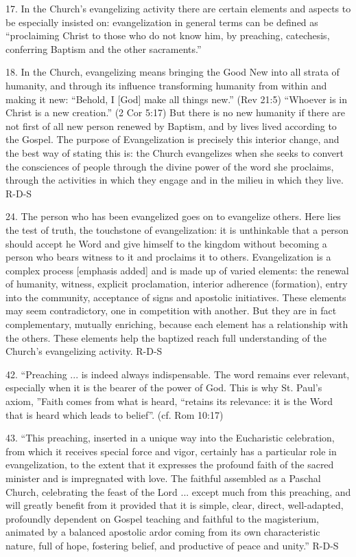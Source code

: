 \documentclass[oneside]{book}
\begin{document}
17. In the Church's evangelizing activity there are certain elements and aspects
to be especially insisted on: evangelization in general terms can be defined as
``proclaiming Christ to those who do not know him, by preaching, catechesis,
conferring Baptism and the other sacraments.''

18. In the Church, evangelizing means bringing the Good New into all strata of
humanity, and through its influence transforming humanity from within and making
it new: ``Behold, I [God] make all things new.'' (Rev 21:5) ``Whoever is in
Christ is a new creation.'' (2 Cor 5:17) But there is no new humanity if there
are not first of all new person renewed by Baptism, and by lives lived according
to the Gospel. The purpose of Evangelization is precisely this interior change,
and the best way of stating this is: the Church evangelizes when she seeks to
convert the consciences of people through the divine power of the word she
proclaims, through the activities in which they engage and in the milieu in
which they live.
R-D-S

24. The person who has been evangelized goes on to evangelize others. Here lies
the test of truth, the touchstone of evangelization: it is unthinkable that a
person should accept he Word and give himself to the kingdom without becoming a
person who bears witness to it and proclaims it to others. Evangelization is a
complex process [emphasis added] and is made up of varied elements: the renewal
of humanity, witness, explicit proclamation, interior adherence (formation),
entry into the community, acceptance of signs and apostolic initiatives. These
elements may seem contradictory, one in competition with another. But they are
in fact complementary, mutually enriching, because each element has a
relationship with the others. These elements help the baptized reach full
understanding of the Church's evangelizing activity.
R-D-S

42. ``Preaching ... is indeed always indispensable. The word remains ever
relevant, especially when it is the bearer of the power of God. This is why
St. Paul's axiom, ''Faith comes from what is heard, ``retains its relevance: it
is the Word that is heard which leads to belief''. (cf. Rom 10:17)

43. ``This preaching, inserted in a unique way into the Eucharistic celebration,
from which it receives special force and vigor, certainly has a particular role
in evangelization, to the extent that it expresses the profound faith of the
sacred minister and is impregnated with love. The faithful assembled as a
Paschal Church, celebrating the feast of the Lord ... except much from this
preaching, and will greatly benefit from it provided that it is simple, clear,
direct, well-adapted, profoundly dependent on Gospel teaching and faithful to
the magisterium, animated by a balanced apostolic ardor coming from its own
characteristic nature, full of hope, fostering belief, and productive of peace
and unity.''
R-D-S
\end{document}
